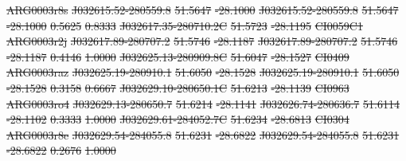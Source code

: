 \documentclass[11pt, a4paper]{book}
\providecommand{\DIFdeltex}[1]{{\protect\color{red}\sout{#1}}}                      %
\providecommand{\DIFdel}[1]{\texorpdfstring{\DIFdeltex{#1}}{}} %
\begin{document}
\DIFdel{ARG0003r8s }%
\DIFdel{J032615.52-280559.8 }%
\DIFdel{51.5647 }%
\DIFdel{-28.1000 }%
\DIFdel{J032615.52-280559.8 }%
\DIFdel{51.5647 }%
\DIFdel{-28.1000 }%
\DIFdel{0.5625 }%
\DIFdel{0.8333 }%
\DIFdel{J032617.35-280710.2C }%
\DIFdel{51.5723 }%
\DIFdel{-28.1195 }%
\DIFdel{CI0059C1 }%
\DIFdel{ARG0003r2j }%
\DIFdel{J032617.89-280707.2 }%
\DIFdel{51.5746 }%
\DIFdel{-28.1187 }%
\DIFdel{J032617.89-280707.2 }%
\DIFdel{51.5746 }%
\DIFdel{-28.1187 }%
\DIFdel{0.4146 }%
\DIFdel{1.0000 }%
\DIFdel{J032625.13-280909.8C }%
\DIFdel{51.6047 }%
\DIFdel{-28.1527 }%
\DIFdel{CI0409 }%
\DIFdel{ARG0003raz }%
\DIFdel{J032625.19-280910.1 }%
\DIFdel{51.6050 }%
\DIFdel{-28.1528 }%
\DIFdel{J032625.19-280910.1 }%
\DIFdel{51.6050 }%
\DIFdel{-28.1528 }%
\DIFdel{0.3158 }%
\DIFdel{0.6667 }%
\DIFdel{J032629.10-280650.1C }%
\DIFdel{51.6213 }%
\DIFdel{-28.1139 }%
\DIFdel{CI0963 }%
\DIFdel{ARG0003ro4 }%
\DIFdel{J032629.13-280650.7 }%
\DIFdel{51.6214 }%
\DIFdel{-28.1141 }%
\DIFdel{J032626.74-280636.7 }%
\DIFdel{51.6114 }%
\DIFdel{-28.1102 }%
\DIFdel{0.3333 }%
\DIFdel{1.0000 }%
\DIFdel{J032629.61-284052.7C }%
\DIFdel{51.6234 }%
\DIFdel{-28.6813 }%
\DIFdel{CI0304 }%
\DIFdel{ARG0003r8e }%
\DIFdel{J032629.54-284055.8 }%
\DIFdel{51.6231 }%
\DIFdel{-28.6822 }%
\DIFdel{J032629.54-284055.8 }%
\DIFdel{51.6231 }%
\DIFdel{-28.6822 }%
\DIFdel{0.2676 }%
\DIFdel{1.0000 }%
\end{document}
